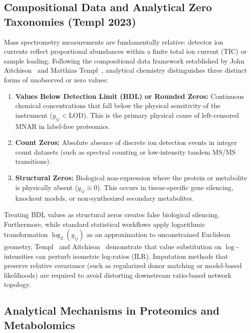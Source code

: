 \documentclass[11pt,oneside]{book}
\begin{document}
\subsection{Compositional Data and Analytical Zero Taxonomies (Templ 2023)}

Mass spectrometry measurements are fundamentally relative: detector ion currents reflect proportional abundances within a finite total ion current (TIC) or sample loading. Following the compositional data framework established by John Aitchison~\cite{aitchison1986statistical} and Matthias Templ~\cite{templ2023visualization}, analytical chemistry distinguishes three distinct forms of unobserved or zero values:
\begin{enumerate}
    \item \textbf{Values Below Detection Limit (BDL) or Rounded Zeros:} Continuous chemical concentrations that fall below the physical sensitivity of the instrument ($y_{ij} < \text{LOD}$). This is the primary physical cause of left-censored MNAR in label-free proteomics.
    \item \textbf{Count Zeros:} Absolute absence of discrete ion detection events in integer count datasets (such as spectral counting or low-intensity tandem MS/MS transitions).
    \item \textbf{Structural Zeros:} Biological non-expression where the protein or metabolite is physically absent ($y_{ij} \equiv 0$). This occurs in tissue-specific gene silencing, knockout models, or non-synthesized secondary metabolites.
\end{enumerate}
Treating BDL values as structural zeros creates false biological silencing. Furthermore, while standard statistical workflows apply logarithmic transformation $\log_2(y_{ij})$ as an approximation to unconstrained Euclidean geometry, Templ~\cite{templ2023visualization} and Aitchison~\cite{aitchison1986statistical} demonstrate that value substitution on $\log$-intensities can perturb isometric log-ratios (ILR). Imputation methods that preserve relative covariance (such as regularized donor matching or model-based likelihoods) are required to avoid distorting downstream ratio-based network topology.

\subsection{Analytical Mechanisms in Proteomics and Metabolomics}
\end{document}
